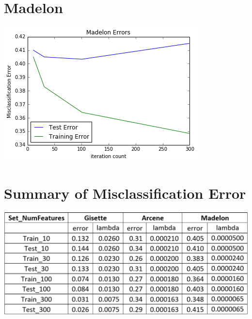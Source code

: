 \documentclass[letter]{article} %
\begin{document}
\clearpage
{}

\section*{Madelon}
\includegraphics[scale=0.8]{madelon}

\section*{Summary of Misclassification Error}
\includegraphics[scale=0.7]{table}

\clearpage
\end{document}
